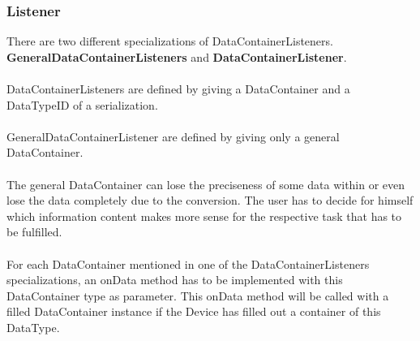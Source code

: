 \subsubsection{Listener}
There are two different specializations of DataContainerListeners. \textbf{GeneralDataContainerListeners} and \textbf{DataContainerListener}. 
\\\\
DataContainerListeners are defined by giving a DataContainer and a DataTypeID of a serialization. 
\\\\
GeneralDataContainerListener are defined by giving only a general DataContainer. 
\\\\
The general DataContainer can lose the preciseness of some data within or even lose the data completely due to the conversion. The user has to decide for himself which information content makes more sense for the respective task that has to be fulfilled. 
\\\\
For each DataContainer mentioned in one of the DataContainerListeners specializations, an onData method has to be implemented with this DataContainer type as parameter. This onData method will be called with a filled DataContainer instance if the Device has filled out a container of this DataType.
\newpage
